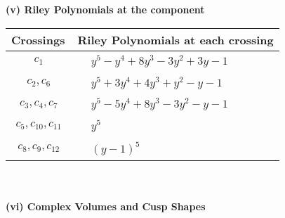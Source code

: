 \documentclass[1p]{elsarticle_modified}
\theoremstyle{definition}
\begin{document}
\newpage\renewcommand{\arraystretch}{1}
\flushleft \textbf{(v) Riley Polynomials at the component}\newline \\
\begin{tabular}{m{50pt}|m{274pt}}
Crossings & \hspace{64pt}Riley Polynomials at each crossing \\
\hline $$\begin{aligned}c_{1}\end{aligned}$$&$\begin{aligned}
&y^5- y^4+8 y^3-3 y^2+3 y-1
\end{aligned}$\\
\hline $$\begin{aligned}c_{2},c_{6}\end{aligned}$$&$\begin{aligned}
&y^5+3 y^4+4 y^3+y^2- y-1
\end{aligned}$\\
\hline $$\begin{aligned}c_{3},c_{4},c_{7}\end{aligned}$$&$\begin{aligned}
&y^5-5 y^4+8 y^3-3 y^2- y-1
\end{aligned}$\\
\hline $$\begin{aligned}c_{5},c_{10},c_{11}\end{aligned}$$&$\begin{aligned}
&y^5
\end{aligned}$\\
\hline $$\begin{aligned}c_{8},c_{9},c_{12}\end{aligned}$$&$\begin{aligned}
&(y-1)^5
\end{aligned}$\\
\hline
\end{tabular}\\~\\
\newpage\flushleft \textbf{(vi) Complex Volumes and Cusp Shapes}
\end{document}
